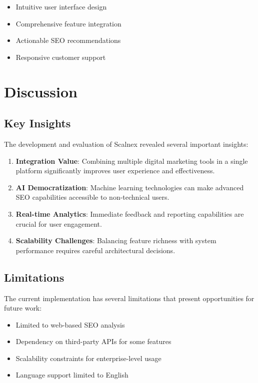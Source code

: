 \documentclass[11pt,a4paper]{article}
\begin{document}
\begin{itemize}
    \item Intuitive user interface design
    \item Comprehensive feature integration
    \item Actionable SEO recommendations
    \item Responsive customer support
\end{itemize}

\section{Discussion}
\label{sec:discussion}

\subsection{Key Insights}
The development and evaluation of Scalnex revealed several important insights:

\begin{enumerate}
    \item \textbf{Integration Value}: Combining multiple digital marketing tools in a single platform significantly improves user experience and effectiveness.
    
    \item \textbf{AI Democratization}: Machine learning technologies can make advanced SEO capabilities accessible to non-technical users.
    
    \item \textbf{Real-time Analytics}: Immediate feedback and reporting capabilities are crucial for user engagement.
    
    \item \textbf{Scalability Challenges}: Balancing feature richness with system performance requires careful architectural decisions.
\end{enumerate}

\subsection{Limitations}
The current implementation has several limitations that present opportunities for future work:

\begin{itemize}
    \item Limited to web-based SEO analysis
    \item Dependency on third-party APIs for some features
    \item Scalability constraints for enterprise-level usage
    \item Language support limited to English
\end{itemize}
\end{document}
